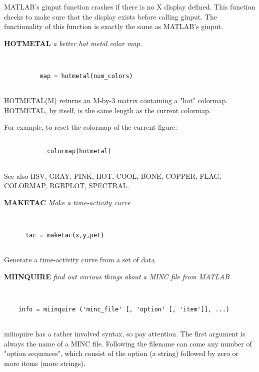   MATLAB's ginput function crashes if there is no X display
  defined.  This function checks to make sure that the display
  exists before calling ginput.  The functionality of this
  function is exactly the same as MATLAB's ginput.
\endfunchelp


{\large\bf HOTMETAL} {\em a better hot metal color map.}
\begin{verbatim}


          map = hotmetal(num_colors)


\end{verbatim}

  HOTMETAL(M) returns an M-by-3 matrix containing a "hot" colormap.
  HOTMETAL, by itself, is the same length as the current colormap.
 
  For example, to reset the colormap of the current figure:

\begin{verbatim}
 
            colormap(hotmetal)
 
\end{verbatim}

  See also HSV, GRAY, PINK, HOT, COOL, BONE, COPPER, FLAG,
           COLORMAP, RGBPLOT, SPECTRAL.
\endfunchelp


{\large\bf MAKETAC} {\em Make a time-activity curve}
\begin{verbatim}


      tac = maketac(x,y,pet)


\end{verbatim}

      Generate a time-activity curve from a set of data.
\endfunchelp


{\large\bf MIINQUIRE} {\em   find out various things about a MINC file from MATLAB}
\begin{verbatim}


    info = miinquire ('minc_file' [, 'option' [, 'item']], ...)


\end{verbatim}

  miinquire has a rather involved syntax, so pay attention.  The first
  argument is always the name of a MINC file.  Following the filename
  can come any number of "option sequences", which consist of the option
  (a string) followed by zero or more items (more strings).
 
